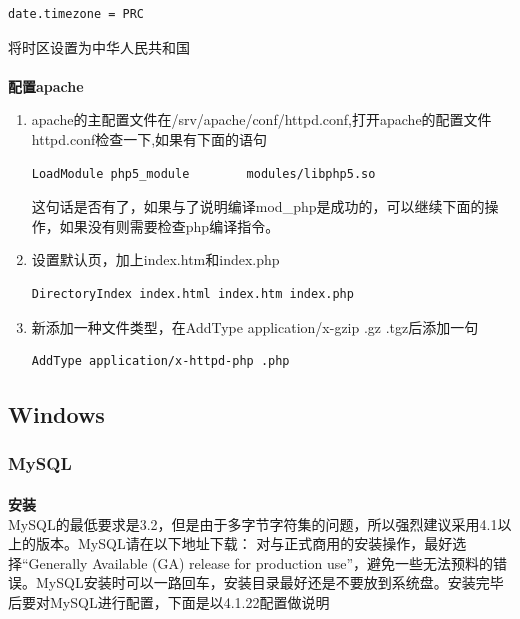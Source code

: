 \documentclass{article}
\begin{document}
\begin{verbatim}
date.timezone = PRC
\end{verbatim}
将时区设置为中华人民共和国

\paragraph{}\textbf{配置apache}\\

\begin{enumerate}
\item apache的主配置文件在/srv/apache/conf/httpd.conf,打开apache的配置文件httpd.conf检查一下,如果有下面的语句
\begin{verbatim}
LoadModule php5_module        modules/libphp5.so
\end{verbatim}
这句话是否有了，如果与了说明编译mod\_php是成功的，可以继续下面的操作，如果没有则需要检查php编译指令。

\item 设置默认页，加上index.htm和index.php
\begin{verbatim}
DirectoryIndex index.html index.htm index.php
\end{verbatim}
\item 新添加一种文件类型，在AddType application/x-gzip .gz .tgz后添加一句
\begin{verbatim}
AddType application/x-httpd-php .php
\end{verbatim}
\end{enumerate}

\hypertarget{toc7}{}
\subsection{Windows}
\hypertarget{toc8}{}
\subsubsection{MySQL}
\paragraph{}\textbf{安装}\\

MySQL的最低要求是3.2，但是由于多字节字符集的问题，所以强烈建议采用4.1以上的版本。MySQL请在以下地址下载：
对与正式商用的安装操作，最好选择“Generally Available (GA) release for production use”，避免一些无法预料的错误。MySQL安装时可以一路回车，安装目录最好还是不要放到系统盘。安装完毕后要对MySQL进行配置，下面是以4.1.22配置做说明
\end{document}
